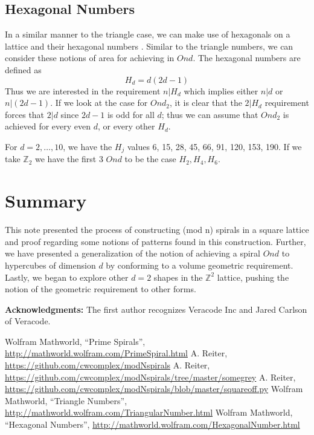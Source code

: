 \documentclass[11pt,reqno]{amsart}
\theoremstyle{mydef}
\begin{document}
\subsection{Hexagonal Numbers}

In a similar manner to the triangle case, we can make use of hexagonals on a lattice and 
their hexagonal numbers  \cite{HexagonalNumbers}. Similar to the triangle numbers, we
can consider these notions of area for achieving in $Ond$. The hexagonal numbers are
defined as 
\[
	H_d = d(2d - 1)
\]
Thus we are interested in the requirement $n \vert H_d$ which implies either $n \vert d$ or
$n \vert (2d - 1)$.  If we look at the case for $Ond_2$, it is clear that the $2 \vert H_d$ requirement
forces that $2 \vert d$ since $2d -1$ is odd for all $d$; thus we can assume that $Ond_2$ is
achieved for every even $d$, or every other $H_d$.

For $d = 2, \ldots, 10$, we
have the $H_j$ values 6, 15, 28, 45, 66, 91, 120, 153, 190. If we take $\mathbb{Z}_2$ we have the first 3 $Ond$
to be the case $H_2, H_4, H_6$.

\section{Summary}
This note presented the process of constructing (mod n) spirals in a square lattice and proof regarding some 
notions of patterns found in this construction. Further, we have presented a generalization of the notion of
achieving a spiral $Ond$ to hypercubes of dimension $d$ by conforming to a volume geometric requirement.
Lastly, we began to explore other $d = 2$ shapes in the $\mathbb{Z}^2$ lattice, pushing the notion of the 
geometric requirement to other forms. 

\vspace{12pt}\noindent\textbf{Acknowledgments:}\quad
The first author recognizes Veracode Inc and Jared Carlson of Veracode.

\begin{thebibliography}{1}
 Wolfram Mathworld, ``Prime Spirals'',
  \url{http://mathworld.wolfram.com/PrimeSpiral.html}
 A. Reiter,
  \url{https://github.com/cwcomplex/modNspirals}
 A. Reiter,
  \url{https://github.com/cwcomplex/modNspirals/tree/master/somegrey}
 A. Reiter,
  \url{https://github.com/cwcomplex/modNspirals/blob/master/squareoff.py}
 Wolfram Mathworld, ``Triangle Numbers'',
  \url{http://mathworld.wolfram.com/TriangularNumber.html}
 Wolfram Mathworld, ``Hexagonal Numbers'',
  \url{http://mathworld.wolfram.com/HexagonalNumber.html}
\end{thebibliography}
\end{document}
